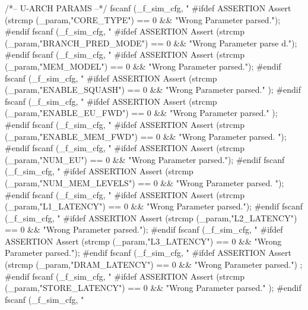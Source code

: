 \begin{DoxyCode}
{        /*-- U-ARCH PARAMS --*/
        fscanf (_f_sim_cfg, "%
        #ifdef ASSERTION
        Assert (strcmp (_param,"CORE_TYPE") == 0 && "Wrong Parameter parsed.");
        #endif
        fscanf (_f_sim_cfg, "%
        #ifdef ASSERTION
        Assert (strcmp (_param,"BRANCH_PRED_MODE") == 0 && "Wrong Parameter parse
      d.");
        #endif
        fscanf (_f_sim_cfg, "%
        #ifdef ASSERTION
        Assert (strcmp (_param,"MEM_MODEL") == 0 && "Wrong Parameter parsed.");
        #endif
        fscanf (_f_sim_cfg, "%
        #ifdef ASSERTION
        Assert (strcmp (_param,"ENABLE_SQUASH") == 0 && "Wrong Parameter parsed."
      );
        #endif
        fscanf (_f_sim_cfg, "%
        #ifdef ASSERTION
        Assert (strcmp (_param,"ENABLE_EU_FWD") == 0 && "Wrong Parameter parsed."
      );
        #endif
        fscanf (_f_sim_cfg, "%
        #ifdef ASSERTION
        Assert (strcmp (_param,"ENABLE_MEM_FWD") == 0 && "Wrong Parameter parsed.
      ");
        #endif
        fscanf (_f_sim_cfg, "%
        #ifdef ASSERTION
        Assert (strcmp (_param,"NUM_EU") == 0 && "Wrong Parameter parsed.");
        #endif
        fscanf (_f_sim_cfg, "%
        #ifdef ASSERTION
        Assert (strcmp (_param,"NUM_MEM_LEVELS") == 0 && "Wrong Parameter parsed.
      ");
        #endif
        fscanf (_f_sim_cfg, "%
        #ifdef ASSERTION
        Assert (strcmp (_param,"L1_LATENCY") == 0 && "Wrong Parameter parsed.");
        #endif
        fscanf (_f_sim_cfg, "%
        #ifdef ASSERTION
        Assert (strcmp (_param,"L2_LATENCY") == 0 && "Wrong Parameter parsed.");
        #endif
        fscanf (_f_sim_cfg, "%
        #ifdef ASSERTION
        Assert (strcmp (_param,"L3_LATENCY") == 0 && "Wrong Parameter parsed.");
        #endif
        fscanf (_f_sim_cfg, "%
        #ifdef ASSERTION
        Assert (strcmp (_param,"DRAM_LATENCY") == 0 && "Wrong Parameter parsed.")
      ;
        #endif
        fscanf (_f_sim_cfg, "%
        #ifdef ASSERTION
        Assert (strcmp (_param,"STORE_LATENCY") == 0 && "Wrong Parameter parsed."
      );
        #endif
        fscanf (_f_sim_cfg, "%
}
\end{DoxyCode}

